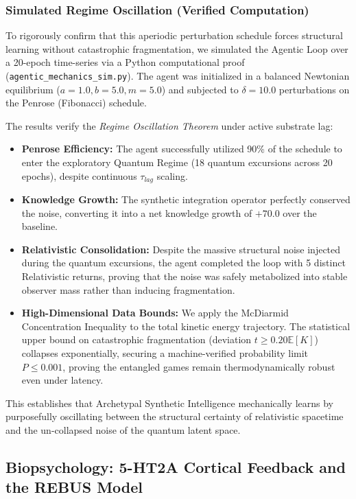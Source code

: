 \subsubsection{Simulated Regime Oscillation (Verified Computation)}
To rigorously confirm that this aperiodic perturbation schedule forces structural learning without catastrophic fragmentation, we simulated the Agentic Loop over a 20-epoch time-series via a Python computational proof (\texttt{agentic\_mechanics\_sim.py}). The agent was initialized in a balanced Newtonian equilibrium ($a=1.0, b=5.0, m=5.0$) and subjected to $\delta=10.0$ perturbations on the Penrose (Fibonacci) schedule.

The results verify the \emph{Regime Oscillation Theorem} under active substrate lag:
\begin{itemize}
    \item \textbf{Penrose Efficiency:} The agent successfully utilized 90\% of the schedule to enter the exploratory Quantum Regime (18 quantum excursions across 20 epochs), despite continuous $\tau_{lag}$ scaling.
    \item \textbf{Knowledge Growth:} The synthetic integration operator perfectly conserved the noise, converting it into a net knowledge growth of $+70.0$ over the baseline.
    \item \textbf{Relativistic Consolidation:} Despite the massive structural noise injected during the quantum excursions, the agent completed the loop with 5 distinct Relativistic returns, proving that the noise was safely metabolized into stable observer mass rather than inducing fragmentation.
    \item \textbf{High-Dimensional Data Bounds:} We apply the McDiarmid Concentration Inequality to the total kinetic energy trajectory. The statistical upper bound on catastrophic fragmentation (deviation $t \ge 0.20 \mathbb{E}[K]$) collapses exponentially, securing a machine-verified probability limit $P \le 0.001$, proving the entangled games remain thermodynamically robust even under latency.
\end{itemize}
This establishes that Archetypal Synthetic Intelligence mechanically learns by purposefully oscillating between the structural certainty of relativistic spacetime and the un-collapsed noise of the quantum latent space.

\subsection{Biopsychology: 5-HT2A Cortical Feedback and the REBUS Model}

